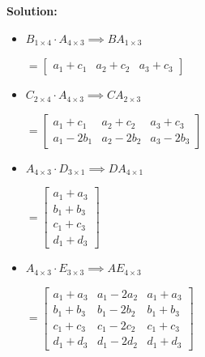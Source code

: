 \textbf{Solution:}
\begin{itemize}[label=\alph*)]
    \item $B_{1 \times 4} \cdot \! A_{4 \times 3} \implies BA_{1 \times 3}$
        \begin{answer}
            $ = \begin{bmatrix}
                a_1 + c_1 & a_2 + c_2 & a_3 + c_3
            \end{bmatrix}$
        \end{answer}
    \item $C_{2 \times 4} \cdot \! A_{4 \times 3} \implies CA_{2 \times 3}$
        \begin{answer}
            $ = \begin{bmatrix}
                a_1 + c_1  & a_2 + c_2     & a_3 + c_3 \\
                a_1 - 2b_1 & a_2 -2b_2  & a_3 -2b_3
            \end{bmatrix}$
        \end{answer}
    \item $A_{4 \times 3} \cdot \! D_{3 \times 1} \implies DA_{4 \times 1}$
        \begin{answer}
            $ = \begin{bmatrix}
                a_1 + a_3 \\
                b_1 + b_3 \\
                c_1 + c_3  \\
                d_1 + d_3
            \end{bmatrix}$
        \end{answer}
    \item $A_{4 \times 3} \cdot \! E_{3 \times 3} \implies AE_{4 \times 3}$
        \begin{answer}
            $ = \begin{bmatrix}
                a_1 + a_3  & a_1 -2a_2  & a_1 + a_3 \\
                b_1 + b_3  & b_1 -2b_2  & b_1 + b_3 \\
                c_1 + c_3   & c_1 -2c_2  & c_1 + c_3 \\
                d_1 + d_3  & d_1 -2d_2  & d_1 + d_3
            \end{bmatrix}$
        \end{answer}
\end{itemize}
